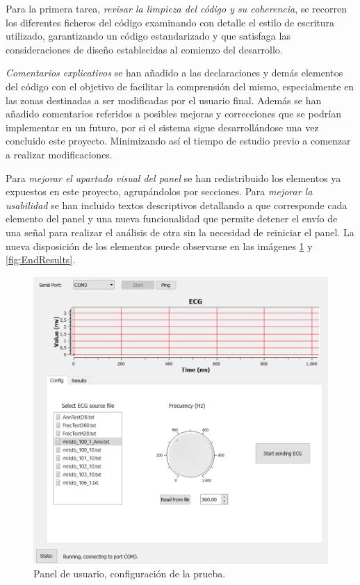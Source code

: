         Para la primera tarea, \textit{revisar la limpieza del código y su coherencia}, se recorren los diferentes ficheros del código examinando con detalle el estilo de escritura utilizado, garantizando un código estandarizado y que satisfaga las consideraciones de diseño establecidas al comienzo del desarrollo.
        
       \textit{Comentarios explicativos} se han añadido a las declaraciones y demás elementos del código con el objetivo de facilitar la comprensión del mismo, especialmente en las zonas destinadas a ser modificadas por el usuario final. Además se han añadido comentarios referidos a posibles mejoras y correcciones que se podrían implementar en un futuro, por si el sistema sigue desarrollándose una vez concluido este proyecto. Minimizando así el tiempo de estudio previo a comenzar a realizar modificaciones.
       
       Para \textit{mejorar el apartado visual del panel} se han redistribuido los elementos ya expuestos en este proyecto, agrupándolos por secciones. Para \textit{mejorar la usabilidad} se han incluido textos descriptivos detallando a que corresponde cada elemento del panel y una nueva funcionalidad que permite detener el envío de una señal para realizar el análisis de otra sin la necesidad de reiniciar el panel. La nueva disposición de los elementos puede observarse en las imágenes \ref{fig:EndConfig} y \ref{fig:EndResults}.
       
       \begin{figure}[H]
            \centering
                    \includegraphics[width = \linewidth]{figuras/Config.PNG}
            \caption{Panel de usuario, configuración de la prueba.}
            \label{fig:EndConfig}
        \end{figure}
        
